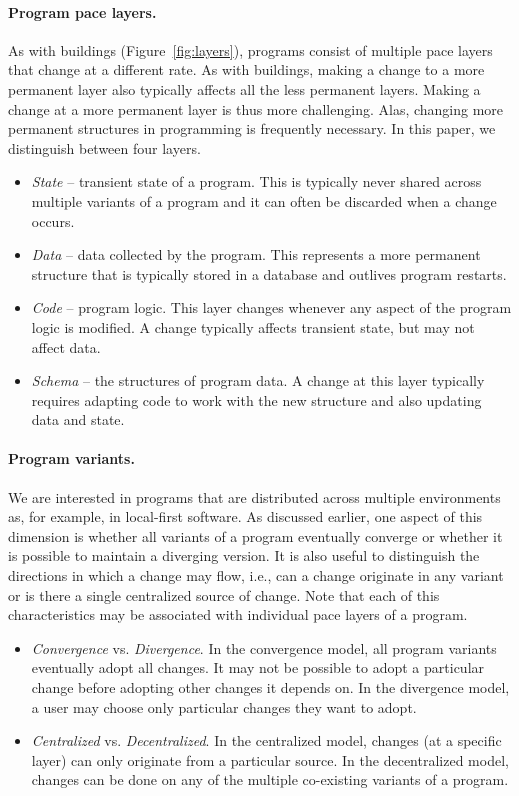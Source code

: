 \documentclass[english,submission]{programming}
\begin{document}
\paragraph{Program pace layers.} As with buildings (Figure~\ref{fig:layers}), programs consist
of multiple pace layers that change at a different rate. As with buildings, making a change
to a more permanent layer also typically affects all the less permanent layers. Making a change
at a more permanent layer is thus more challenging. Alas, changing more permanent structures in
programming is frequently necessary. In this paper, we distinguish between four layers.

\begin{itemize}
\item \emph{State} -- transient state of a program. This is typically never shared across
  multiple variants of a program and it can often be discarded when a change occurs.
\item \emph{Data} -- data collected by the program. This represents a more permanent structure
  that is typically stored in a database and outlives program restarts.
\item \emph{Code} -- program logic. This layer changes whenever any aspect of the program logic
  is modified. A change typically affects transient state, but may not affect data.
\item \emph{Schema} -- the structures of program data. A change at this layer typically
  requires adapting code to work with the new structure and also updating data and state.
\end{itemize}

\paragraph{Program variants.} We are interested in programs that are distributed across multiple
environments as, for example, in local-first software. As discussed earlier, one aspect of this
dimension is whether all variants of a program eventually converge or whether it is possible to
maintain a diverging version. It is also useful to distinguish the directions in which a
change may flow, i.e., can a change originate in any variant or is there a single centralized
source of change. Note that each of this characteristics may  be associated with individual pace
layers of a program.

\begin{itemize}
\item \emph{Convergence} vs. \emph{Divergence}. In the convergence model, all program variants
  eventually adopt all changes. It may not be possible to adopt a particular change before adopting
  other changes it depends on. In the divergence model, a user may choose only particular changes
  they want to adopt.
\item \emph{Centralized} vs. \emph{Decentralized}. In the centralized model, changes (at a
  specific layer) can only originate from a particular source. In the decentralized model,
  changes can be done on any of the multiple co-existing variants of a program.
\end{itemize}
\end{document}
